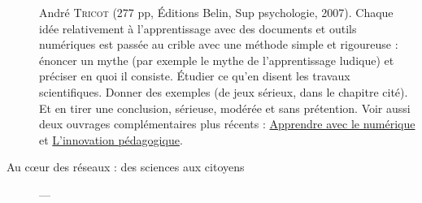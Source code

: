\begin{description}
André \textsc{Tricot} (277 pp, Éditions Belin, Sup psychologie, 2007). Chaque idée relativement à l'apprentissage avec des documents et outils numériques est passée au crible avec une méthode simple et rigoureuse : énoncer un mythe (par exemple le mythe de l’apprentissage ludique) et préciser en quoi il consiste. Étudier ce qu’en disent les travaux scientifiques. Donner des exemples (de jeux sérieux, dans le chapitre cité). Et en tirer une conclusion, sérieuse, modérée et sans prétention. Voir aussi deux ouvrages complémentaires plus récents : \href{http://www.cafepedagogique.net/lexpresso/Pages/2014/10/21102014Article635494737667005194.aspx}{Apprendre avec le numérique} et \href{http://www.cafepedagogique.net/LEXPRESSO/Pages/2017/09/05092017Article636401937485284884.aspx}{L'innovation pédagogique}.
\item[Au cœur des réseaux : des sciences aux citoyens] --- 

\end{description}
